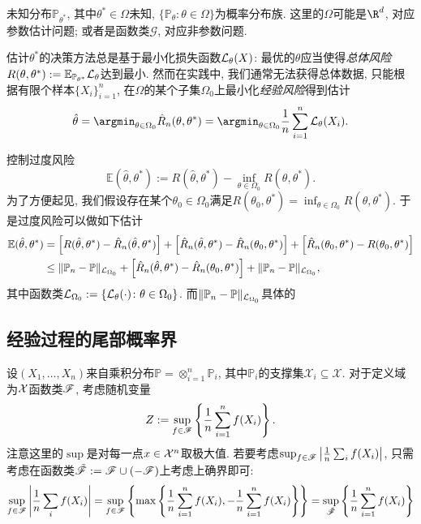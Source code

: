 未知分布$\mathbb{P}_{\theta^*}$, 其中$\theta^* \in \Omega$未知, $\{ \mathbb{P}_{\theta} \colon \theta \in \Omega\}$为概率分布族. 
这里的$\Omega$可能是$\R^d$, 对应参数估计问题; 或者是函数类$\mathscr{G}$, 对应非参数问题. 

估计$\theta^*$的决策方法总是基于最小化损失函数$\mathcal{L}_{\theta} (X)$: 最优的$\theta$应当使得\emph{总体风险}$R(\theta, \theta^*) := \mathbb{E}_{\mathbb{P}_{\theta^*}}\mathcal{L}_{\theta}$达到最小. 
然而在实践中, 我们通常无法获得总体数据, 只能根据有限个样本$\{ X_i \}_{i=1}^n$, 在$\Omega$的某个子集$\Omega_0$上最小化\emph{经验风险}得到估计
\begin{equation*}
	\hat \theta 
	= \argmin_{\theta \in \Omega_0} \hat R_n (\theta, \theta^*) 
	= \argmin_{\theta \in \Omega_0} \frac{1}{n} \sum_{i=1}^n \cL_{\theta}(X_i). 
\end{equation*}


控制过度风险
\begin{equation*}
	\mathbb{E}(\hat \theta, \theta^*)
	:= R(\hat \theta, \theta^*) - \inf_{\theta \in \Omega_0} R(\theta, \theta^*). 
\end{equation*}
为了方便起见, 我们假设存在某个$\theta_0 \in \Omega_0$满足$R(\theta_0, \theta^*) = \inf_{\theta \in \Omega_0}R(\theta, \theta^*)$. 
于是过度风险可以做如下估计
\begin{align*}
	\mathbb{E}(\hat \theta, \theta^*)
	&= \left[ R(\hat \theta, \theta^*) - \hat R_n(\hat \theta, \theta^*) \right] 
	+ \left[ \hat R_n(\hat \theta, \theta^*) - \hat R_n(\theta_0, \theta^*) \right]
	+ \left[ \hat R_n(\theta_0, \theta^*) - R(\theta_0, \theta^*) \right] \\
	&\leq \|\mathbb{P}_n - \mathbb{P}\|_{\mathcal{L}_{\Omega_0}} 
	+ \left[ \hat R_n(\hat \theta, \theta^*) - \hat R_n(\theta_0, \theta^*) \right]
	+ \|\mathbb{P}_n - \mathbb{P}\|_{\mathcal{L}_{\Omega_0}}, 
\end{align*}
其中函数类$\mathcal{L}_{\Omega_0} := \{ \mathcal{L}_{\theta}(\cdot) \colon \theta \in \Omega_0 \}$. 
而$\|\mathbb{P}_n - \mathbb{P}\|_{\mathcal{L}_{\Omega_0}}$具体的




\subsection{经验过程的尾部概率界}

设$(X_1, \dots, X_n)$来自乘积分布$\mathbb{P} = \otimes_{i=1}^n \mathbb{P}_i$, 其中$\mathbb{P}_i$的支撑集$\mathcal{X}_i \subseteq \mathcal{X}$. 
对于定义域为$\mathcal{X}$函数类$\mathscr{F}$, 考虑随机变量
\begin{equation*}
	Z := \sup_{f \in \mathscr{F}} \left\{ \frac{1}{n} \sum_{i=1}^n f(X_i) \right\}. 
\end{equation*}
注意这里的$\sup$是对每一点$x \in \mathcal{X}^n$取极大值. 
若要考虑$\sup_{f \in \mathscr{F}} \left| \frac{1}{n} \sum_i f(X_i) \right|$, 只需考虑在函数类$\tilde {\mathscr{F}} := \mathscr{F} \cup (- \mathscr{F})$上考虑上确界即可: 
\begin{equation*}
	\sup_{f \in \mathscr{F}} \left| \frac{1}{n} \sum_i f(X_i) \right|
	= \sup_{f \in \mathscr{F}} \left\{ \max \left\{ \frac{1}{n} \sum_{i=1}^n f(X_i), - \frac{1}{n} \sum_{i=1}^n f(X_i) \right\} \right\} 
	= \sup_{\tilde {\mathscr{F}}} \left\{ \frac{1}{n} \sum_{i=1}^n f(X_i) \right\}
\end{equation*}

